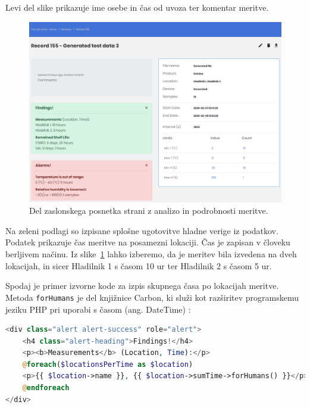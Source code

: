 \documentclass[a4paper, 12pt]{book}
\begin{document}
Levi del slike prikazuje ime osebe in čas od uvoza ter komentar meritve.

\begin{figure}[h]
\begin{center}
\includegraphics[width=\textwidth]{slike/record_page_11.png}
\end{center}
\caption{Del zaslonskega posnetka strani z analizo in podrobnosti meritve.}
\label{ss-record-page}
\end{figure}

Na zeleni podlagi so izpisane splošne ugotovitve hladne verige iz podatkov. Podatek  prikazuje čas meritve na posamezni lokaciji. Čas je zapisan v človeku berljivem načinu. Iz slike~\ref{ss-record-page} lahko izberemo, da je meritev bila izvedena na dveh lokacijah, in sicer Hladilnik 1 s časom 10 ur ter Hladilnik 2 s časom 5 ur. 

Spodaj je primer izvorne kode za izpis skupnega časa po lokacijah meritve. Metoda \verb=forHumans= je del knjižnice Carbon, ki služi kot razširitev programskemu jeziku PHP pri uporabi s časom (ang. DateTime) \cite{carbon-framework}:

\begin{lstlisting}[language=PHP, style=mystyle]
<div class="alert alert-success" role="alert">
    <h4 class="alert-heading">Findings!</h4>
    <p><b>Measurements</b> (Location, Time):</p>
    @foreach($locationsPerTime as $location)
    <p>{{ $location->name }}, {{ $location->sumTime->forHumans() }}</p>
    @endforeach
</div>
\end{lstlisting}

\clearpage
\end{document}
